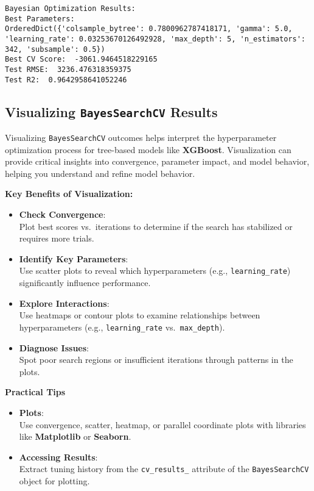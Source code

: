 \documentclass[
  letterpaper,
  DIV=11,
  numbers=noendperiod]{scrreprt}
\begin{document}
\begin{verbatim}
Bayesian Optimization Results: 
Best Parameters: 
OrderedDict({'colsample_bytree': 0.7800962787418171, 'gamma': 5.0, 'learning_rate': 0.03253670126492928, 'max_depth': 5, 'n_estimators': 342, 'subsample': 0.5})
Best CV Score:  -3061.9464518229165
Test RMSE:  3236.476318359375
Test R2:  0.9642958641052246
\end{verbatim}

\subsection{\texorpdfstring{Visualizing \texttt{BayesSearchCV}
Results}{Visualizing BayesSearchCV Results}}\label{visualizing-bayessearchcv-results}

Visualizing \texttt{BayesSearchCV} outcomes helps interpret the
hyperparameter optimization process for tree-based models like
\textbf{XGBoost}. Visualization can provide critical insights into
convergence, parameter impact, and model behavior, helping you
understand and refine model behavior.

\textbf{Key Benefits of Visualization:}

\begin{itemize}
\item
  \textbf{Check Convergence}:\\
  Plot best scores vs.~iterations to determine if the search has
  stabilized or requires more trials.
\item
  \textbf{Identify Key Parameters}:\\
  Use scatter plots to reveal which hyperparameters (e.g.,
  \texttt{learning\_rate}) significantly influence performance.
\item
  \textbf{Explore Interactions}:\\
  Use heatmaps or contour plots to examine relationships between
  hyperparameters (e.g., \texttt{learning\_rate}
  vs.~\texttt{max\_depth}).
\item
  \textbf{Diagnose Issues}:\\
  Spot poor search regions or insufficient iterations through patterns
  in the plots.
\end{itemize}

\textbf{Practical Tips}

\begin{itemize}
\item
  \textbf{Plots}:\\
  Use convergence, scatter, heatmap, or parallel coordinate plots with
  libraries like \textbf{Matplotlib} or \textbf{Seaborn}.
\item
  \textbf{Accessing Results}:\\
  Extract tuning history from the \texttt{cv\_results\_} attribute of
  the \texttt{BayesSearchCV} object for plotting.
\end{itemize}
\end{document}
